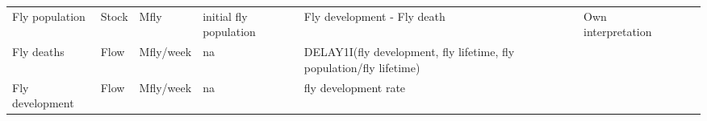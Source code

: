 \begin{landscape}
\begin{longtable}[c]{m{10em}lllm{15em}lll}
Fly population                                & Stock    & Mfly                     & initial fly population    & Fly development - Fly death                                                                                                                                                                                                                                                              & Own interpretation                                                                                                                                                                           &                                                                                                                                                                                                                                       \\
Fly deaths                                    & Flow     & Mfly/week                & na                        & DELAY1I(fly development, fly lifetime, fly population/fly lifetime)                                                                                                                                                                                                                      &                                                                                                                                                                                              &                                                                                                                                                                                                                                       \\
Fly development                               & Flow     & Mfly/week                & na                        & fly development rate                                                                                                                                                                                                                                                                     &                                                                                                                                                                                              &                                                                                                                                                                                                                                       \\

\end{longtable}
\end{landscape}

